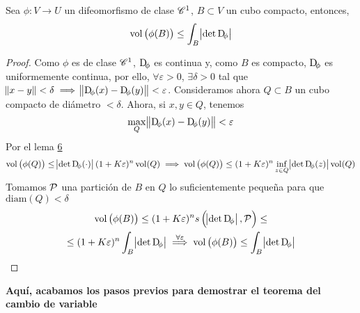 \begin{lema}[(7)]\label{lema:siete_cambio}
    Sea $\phi \colon V \to U$ un difeomorfismo de clase $\mathscr{C}^1$, $B \subset V$ un cubo compacto, entonces,
    \[
        \vol\left( \phi(B) \right) \leq \int_B \abs{\det \Dif_\phi}
    \]
\end{lema}

\begin{proof}
    Como $\phi$ es de clase $\mathscr{C}^1$, $\Dif_\phi$ es continua y, como $B$ es compacto, $\Dif_\phi$ es uniformemente continua, por ello,
    $\forall \varepsilon > 0$, $\exists \delta > 0$ tal que $\norm{x - y} < \delta \implies \norm{\Dif_\phi(x) - \Dif_\phi(y)} < \varepsilon$.
    Consideramos ahora $Q \subset B$ un cubo compacto de diámetro $< \delta$. Ahora, si $x,y \in Q$, tenemos
    \[
        \max_{Q} \norm{\Dif_\phi(x) - \Dif_\phi(y)} < \varepsilon
    \]
    Por el lema \hyperref[lema:seis_cambio]{6}
    \[
        \vol\left( \phi(Q) \right) \leq \abs{\det \Dif_\phi(\cdot)} (1+K\varepsilon)^n \vol(Q) \implies
        \vol\left( \phi(Q) \right) \leq (1+K\varepsilon)^n\inf_{z \in Q} \abs{\det \Dif_\phi(z)} \vol(Q)
    \]
    Tomamos $\mathcal{P}$ una partición de $B$ en $Q$ lo suficientemente pequeña para que $\text{diam}(Q) < \delta$
    \begin{gather*}
        \vol\left( \phi(B) \right) \leq (1+K\varepsilon)^n s\left( \abs{\det \Dif_\phi}, \Pa \right) \leq \\ \leq  (1+K\varepsilon)^n \int_B \abs{\det \Dif_\phi}
        \stackrel{\forall \varepsilon}{\implies} \vol\left( \phi(B) \right) \leq \int_B \abs{\det \Dif_\phi}
    \end{gather*}
\end{proof}

\textbf{Aquí, acabamos los pasos previos para demostrar el teorema del cambio de variable}

